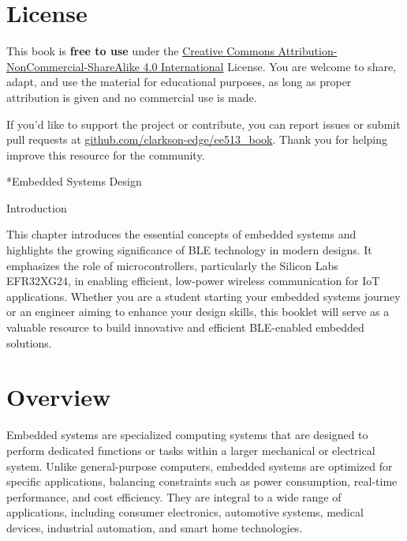 \documentclass[
  9pt,
  letterpaper,
  abstract,
  titlepage]{scrbook}
\makeatletter
\renewcommand\chapter{\clearpage\global\@topnum\z@
\@afterindentfalse \secdef\@chapter\@schapter}
\renewcommand{\part}[1]{%
    \chapter*{#1} %
    \addcontentsline{toc}{part}{#1} %
}
\newif\if@firstnumbered%
\newif\if@firstunnumbered%
\newcounter{lastRomanPage}
\let\old@chapter\chapter%
\renewcommand{\chapter}{%
  \@ifstar{\unnumbered@chapter}{\numbered@chapter}%
}
\newcommand{\numbered@chapter}[1]{%
  \if@firstnumbered%
    \cleardoublepage%
    \setcounter{lastRomanPage}{\value{page}}%
    \pagenumbering{arabic}%
    \@firstnumberedfalse%
  \else
    \setcounter{page}{\value{page}}%
  \fi
  \old@chapter{#1}%
}
\newcommand{\unnumbered@chapter}[1]{%
  \if@firstunnumbered%
    \clearpage
    \setcounter{lastRomanPage}{\value{page}}%
    \pagenumbering{roman}%
    \@firstunnumberedfalse%
  \fi
  \old@chapter*{#1}%
}
\makeatother
\begin{document}
\section*{License}\label{license}


This book is \textbf{free to use} under the
\href{https://creativecommons.org/licenses/by-nc-sa/4.0/}{Creative
Commons Attribution-NonCommercial-ShareAlike 4.0 International} License.
You are welcome to share, adapt, and use the material for educational
purposes, as long as proper attribution is given and no commercial use
is made.

If you'd like to support the project or contribute, you can report
issues or submit pull requests at
\href{https://github.com/clarkson-edge/ee513_book}{github.com/clarkson-edge/ee513\_book}.
Thank you for helping improve this resource for the community.

\part{Embedded Systems Design}

\chapter{Introduction}\label{introduction}

This chapter introduces the essential concepts of embedded systems and
highlights the growing significance of BLE technology in modern designs.
It emphasizes the role of microcontrollers, particularly the Silicon
Labs EFR32XG24, in enabling efficient, low-power wireless communication
for IoT applications. Whether you are a student starting your embedded
systems journey or an engineer aiming to enhance your design skills,
this booklet will serve as a valuable resource to build innovative and
efficient BLE-enabled embedded solutions.

\section{Overview}\label{overview}

Embedded systems are specialized computing systems that are designed to
perform dedicated functions or tasks within a larger mechanical or
electrical system. Unlike general-purpose computers, embedded systems
are optimized for specific applications, balancing constraints such as
power consumption, real-time performance, and cost efficiency. They are
integral to a wide range of applications, including consumer
electronics, automotive systems, medical devices, industrial automation,
and smart home technologies.
\end{document}
